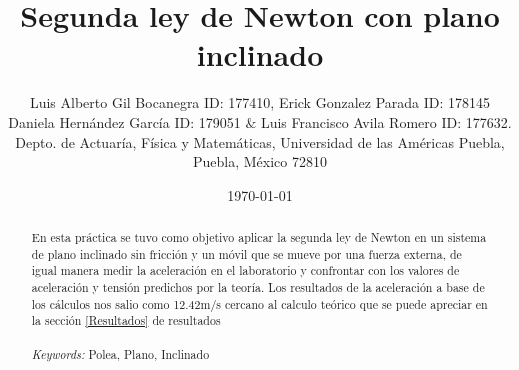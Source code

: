 \documentclass{article}
\begin{document}

\renewcommand{\footrulewidth}{1pt}
\renewcommand{\tablename}{Tabla}
\renewcommand{\figurename}{Figura}


\title{Segunda ley de Newton con plano inclinado}
\author{\small{Luis Alberto Gil Bocanegra ID: 177410, Erick Gonzalez Parada ID: 178145}\\
 \small{Daniela Hernández García ID: 179051 $\&$ Luis Francisco Avila Romero ID: 177632.}\\		%
	   \small{Depto. de Actuaría, Física y Matemáticas, Universidad de las Américas Puebla, Puebla, M\'exico 72810}}
\date{\small{\today}}

\maketitle


\begin{abstract}
En esta práctica se tuvo como objetivo aplicar la segunda ley de Newton en un
sistema de plano inclinado sin fricción y un móvil que se mueve por una fuerza externa, de
igual manera medir la aceleración en el laboratorio y confrontar con los valores de
aceleración y tensión predichos por la teoría. Los resultados de la aceleración a base de los cálculos nos salio como 12.42m/s cercano al calculo teórico que se puede apreciar en la sección \ref{Resultados} de resultados
\\
\\
{\it Keywords:}  Polea, Plano, Inclinado 
\\
\\
\end{abstract}
\end{document}

